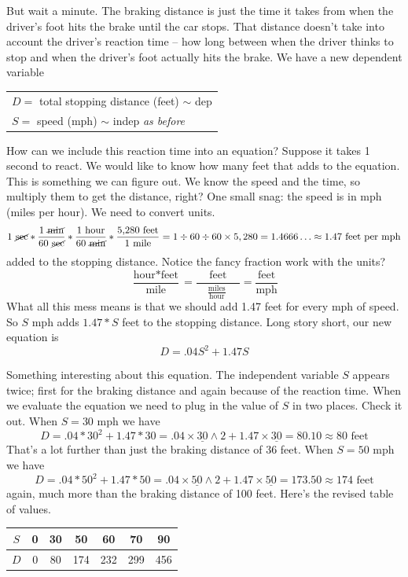 But wait a minute.  The braking distance is just the time it takes from when the driver's foot hits the brake until the car stops.  That distance doesn't take into account the driver's reaction time -- how long between when the driver thinks to stop and when the driver's foot actually hits the brake.  We have a new dependent variable
\begin{center}
\begin{tabular} {l} 
$D=$ total stopping distance (feet) $\sim$ dep \\ 
$S=$ speed (mph) $\sim$ indep \quad \emph{as before}\\
\end{tabular}
\end{center}

How can we include this reaction time into an equation?  Suppose it takes 1 second to react.  We would like to know how many feet that adds to the equation.  This is something we can figure out.  We know the speed and the time, so multiply them to get the distance, right?  One small snag:  the speed is in mph (miles per hour).  We need to convert units.    
$$1 \text{ \cancel{sec}} \ast \frac{1 \text{ \cancel{min}}}{60 \text{ \cancel{sec}}} \ast \frac{1 \text{ hour}}{60 \text{ \cancel{min}}} \ast \frac{\text{5,280 feet}}{1 \text{ mile}}=1 \div 60 \div 60 \times 5,280= 1.4666\ldots \approx 1.47 \text{ feet per mph}$$
added to the stopping distance. 
Notice the fancy fraction work  with the units?
$$\frac{\text{hour}\ast \text{feet}}{\text{mile}}=\frac{\text{feet}}{\quad \frac{\text{miles}}{\text{hour}}\quad~}=\frac{\text{feet}}{\text{mph}}$$
What all this mess means is that we should add 1.47 feet for every mph of speed.  
So $S$ mph adds $1.47\ast S$ feet to the stopping distance.
 Long story short, our new equation is
 $$D=.04S^2+1.47S$$

Something interesting about this equation. The independent variable $S$ appears twice; first for the braking distance and again because of the reaction time. When we evaluate the equation we need to plug in the value of $S$ in two places.  Check it out.
When $S=30$ mph we have $$D =  .04 \ast  30^2 + 1.47 \ast 30 = .04\times \underline{30} \wedge 2 +1.47 \times \underline{30} = 80.10 \approx 80 \text{ feet}$$ 
That's a lot further than just the braking distance of 36 feet.
When $S=50$ mph we have $$D = .04 \ast  50^2 +1.47\ast 50 =  .04\times \underline{50} \wedge 2 +1.47\times \underline{50} = 173.50 \approx 174 \text{ feet}$$
again, much more than the braking distance of 100 feet.
Here's the revised table of values.
\begin{center}
\begin{tabular} {|c| |c|c |c|c|c |c|} \hline
$S$ & 0 & 30 & 50 & 60 & 70 & 90 \\ \hline
$D$ & 0 & 80 & 174 & 232 & 299 & 456 \\ \hline
\end{tabular}
\end{center}

